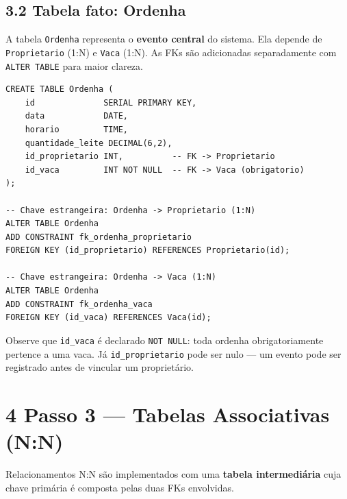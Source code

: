 \documentclass[12pt]{article}
\begin{document}
\vspace{0.3cm}

\subsection*{3.2 \enspace Tabela fato: Ordenha}

A tabela \texttt{Ordenha} representa o \textbf{evento central} do sistema.
Ela depende de \texttt{Proprietario} (1:N) e \texttt{Vaca} (1:N).
As FKs são adicionadas separadamente com \texttt{ALTER TABLE} para maior clareza.

\begin{lstlisting}[caption={Criação da tabela Ordenha e suas FKs 1:N}]
CREATE TABLE Ordenha (
    id              SERIAL PRIMARY KEY,
    data            DATE,
    horario         TIME,
    quantidade_leite DECIMAL(6,2),
    id_proprietario INT,          -- FK -> Proprietario
    id_vaca         INT NOT NULL  -- FK -> Vaca (obrigatorio)
);

-- Chave estrangeira: Ordenha -> Proprietario (1:N)
ALTER TABLE Ordenha
ADD CONSTRAINT fk_ordenha_proprietario
FOREIGN KEY (id_proprietario) REFERENCES Proprietario(id);

-- Chave estrangeira: Ordenha -> Vaca (1:N)
ALTER TABLE Ordenha
ADD CONSTRAINT fk_ordenha_vaca
FOREIGN KEY (id_vaca) REFERENCES Vaca(id);
\end{lstlisting}

\begin{dica}
Observe que \texttt{id\_vaca} é declarado \texttt{NOT NULL}: toda ordenha
obrigatoriamente pertence a uma vaca. Já \texttt{id\_proprietario} pode ser
nulo --- um evento pode ser registrado antes de vincular um proprietário.
\end{dica}

\vspace{0.5cm}

\section*{4 \enspace Passo 3 — Tabelas Associativas (N:N)}

Relacionamentos N:N são implementados com uma \textbf{tabela intermediária}
cuja chave primária é composta pelas duas FKs envolvidas.
\end{document}
